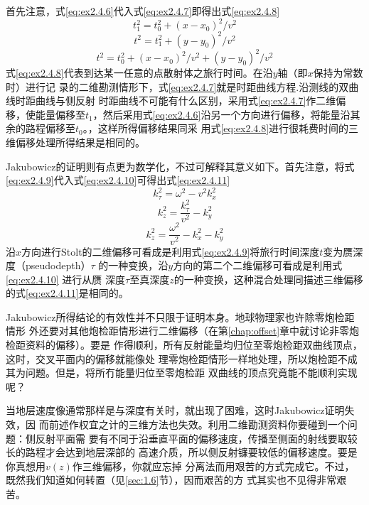 首先注意，式\ref{eq:ex2.4.6}代入式\ref{eq:ex2.4.7}即得出式\ref{eq:ex2.4.8}
\begin{equation}
t_1^2=t_0^2+(x-x_0)^2/v^2
\label{eq:ex2.4.6}
\end{equation}
\begin{equation}
t^2=t_1^2+(y-y_0)^2/v^2
\label{eq:ex2.4.7}
\end{equation}
\begin{equation}
t^2=t_0^2+(x-x_0)^2/v^2+(y-y_0)^2/v^2
\label{eq:ex2.4.8}
\end{equation}
式\ref{eq:ex2.4.8}代表到达某一任意的点散射体之旅行时间。在沿$y$轴（即$x$保持为常数时）进行记
录的二维勘测情形下，式\ref{eq:ex2.4.7}就是时距曲线方程.沿测线的双曲线时距曲线与侧反射
时距曲线不可能有什么区别，采用式\ref{eq:ex2.4.7}作二维偏移，使能量偏移至$t_1$，然后采用式\ref{eq:ex2.4.6}沿另一个方向进行偏移，将能量沿其余的路程偏移至$t_0$。，这样所得偏移结果同采
用式\ref{eq:ex2.4.8}进行很耗费时间的三维偏移处理所得结果是相同的。

Jakubowicz的证明则有点更为数学化，不过可解释其意义如下。首先注意，将式
\ref{eq:ex2.4.9}代入式\ref{eq:ex2.4.10}可得出式\ref{eq:ex2.4.11}
\begin{equation}
k_{\tau}^2=\omega^2-v^2k_x^2
\label{eq:ex2.4.9}
\end{equation}
\begin{equation}
k_z^2=\frac{k_\tau^2}{v^2}-k_y^2
\label{eq:ex2.4.10}
\end{equation}
\begin{equation}
k_z^2=\frac{\omega^2}{v^2}-k_x^2-k_y^2
\label{eq:ex2.4.11}
\end{equation}
沿$x$方向进行Stolt的二维偏移可看成是利用式\ref{eq:ex2.4.9}将旅行时间深度$t$变为赝深度（ps­eudodepth）$\tau$
的一种变换，沿$y$方向的第二个二维偏移可看成是利用式\ref{eq:ex2.4.10} 进行从赝
深度$\tau$至真深度$z$的一种变换，这种混合处理同描述三维偏移的式\ref{eq:ex2.4.11}是相同的。

Jakubowicz所得结论的有效性并不只限于证明本身。地球物理家也许除零炮检距情形
外还要对其他炮检距情形进行二维偏移（在第\ref{chap:offset}章中就讨论非零炮检距资料的偏移）。要是
作得顺利，所有反射能量均归位至零炮检距双曲线顶点，这时，交叉平面内的偏移就能像处
理零炮检距情形一样地处理，所以炮检距不成其为问题。但是，将所冇能量归位至零炮检距
双曲线的顶点究竟能不能顺利实现呢？

当地层速度像通常那样是与深度有关时，就出现了困难，这时Jakubowicz证明失效，因
而前述作权宜之计的三维方法也失效。利用二维勘测资料你要碰到一个问题：侧反射平面需
要有不同于沿垂直平面的偏移速度，传播至侧面的射线要取较长的路程才会达到地层深部的
高速介质，所以侧反射镰要较低的偏移速度。要是你真想用$v(z)$作三维偏移，你就应忘掉
分离法而用艰苦的方式完成它。不过，既然我们知道如何转置（见\ref{sec:1.6}节），因而艰苦的方
式其实也不见得非常艰苦。

